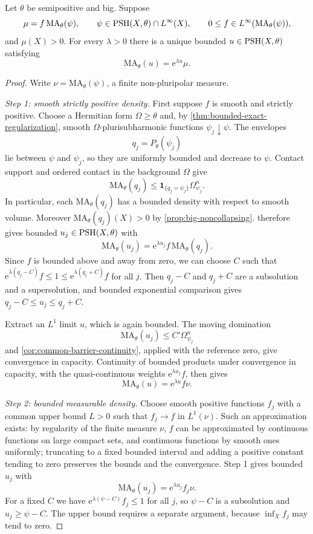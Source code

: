 \begin{theorem}\label{thm:bounded-subsolution}
Let $\theta$ be semipositive and big. Suppose
\[
 \mu=f\,\mathrm{MA}_\theta(\psi),\qquad
 \psi\in\mathrm{PSH}(X,\theta)\cap L^\infty(X),\qquad
 0\leq f\in L^\infty(\mathrm{MA}_\theta(\psi)),
\]
and $\mu(X)>0$. For every $\lambda>0$ there is a unique bounded $u\in\mathrm{PSH}(X,\theta)$ satisfying
\[
 \mathrm{MA}_\theta(u)=\mathrm{e}^{\lambda u}\mu.
\]
\end{theorem}
\begin{proof}
Write $\nu=\mathrm{MA}_\theta(\psi)$, a finite non-pluripolar measure.

\emph{Step 1: smooth strictly positive density.} First suppose $f$ is smooth and strictly positive. Choose a Hermitian form $\Omega\geq\theta$ and, by \cref{thm:bounded-exact-regularization}, smooth $\Omega$-plurisubharmonic functions $\psi_j\downarrow\psi$. The envelopes
\[
 q_j=P_\theta(\psi_j)
\]
lie between $\psi$ and $\psi_j$, so they are uniformly bounded and decrease to $\psi$. Contact support and ordered contact in the background $\Omega$ give
\[
 \mathrm{MA}_\theta(q_j)
 \leq\mathbf1_{\{q_j=\psi_j\}}\Omega_{\psi_j}^n.
\]
In particular, each $\mathrm{MA}_\theta(q_j)$ has a bounded density with respect to smooth volume. Moreover $\mathrm{MA}_\theta(q_j)(X)>0$ by \cref{prop:big-noncollapsing}.  therefore gives bounded $u_j\in\mathrm{PSH}(X,\theta)$ with
\[
 \mathrm{MA}_\theta(u_j)=\mathrm{e}^{\lambda u_j}f\,
                                     \mathrm{MA}_\theta(q_j).
\]
Since $f$ is bounded above and away from zero, we can choose $C$ such that
$\mathrm{e}^{\lambda(q_j-C)}f\leq1\leq \mathrm{e}^{\lambda(q_j+C)}f$ for all $j$. Then $q_j-C$ and $q_j+C$ are a subsolution and a supersolution, and bounded exponential comparison gives
$q_j-C\leq u_j\leq q_j+C$.

Extract an $L^1$ limit $u$, which is again bounded. The moving domination
\[
 \mathrm{MA}_\theta(u_j)\leq C'\Omega_{\psi_j}^n
\]
and \cref{cor:common-barrier-continuity}, applied with the reference zero, give convergence in capacity. Continuity of bounded products under convergence in capacity, with the quasi-continuous weights $\mathrm{e}^{\lambda u_j}f$, then gives
\[
 \mathrm{MA}_\theta(u)=\mathrm{e}^{\lambda u}f\nu.
\]

\emph{Step 2: bounded measurable density.} Choose smooth positive functions $f_j$ with a common upper bound $L>0$ such that $f_j\to f$ in $L^1(\nu)$. Such an approximation exists: by regularity of the finite measure $\nu$, $f$ can be approximated by continuous functions on large compact sets, and continuous functions by smooth ones uniformly; truncating to a fixed bounded interval and adding a positive constant tending to zero preserves the bounds and the convergence. Step 1 gives bounded $u_j$ with
\[
 \mathrm{MA}_\theta(u_j)=\mathrm{e}^{\lambda u_j}f_j\nu.
\]
For a fixed $C$ we have $\mathrm{e}^{\lambda(\psi-C)}f_j\leq1$ for all $j$, so $\psi-C$ is a subsolution and $u_j\geq\psi-C$. The upper bound requires a separate argument, because $\inf_Xf_j$ may tend to zero.


\end{proof}
